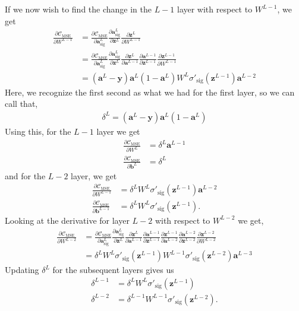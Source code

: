 \documentclass[a4paper,10pt]{article}
\newcommand{\pd}[2]{\frac{\partial {#1}}{\partial {#2}}}
\begin{document}
If we now wish to find the change in the $L-1$ layer with respect to $W^{L-1}$, we get
\begin{align*}
    \frac{\partial \mathcal{C}_\mathrm{MSE}}{\partial W^{L-1}} &= \pd{\mathcal{C}_\mathrm{MSE}}{\bm{a}^L_\mathrm{sig}}\pd{\bm{a}^L_\mathrm{sig}}{\bm{z}^L}\pd{\bm{z}^L}{W^{L-1}} \\
    &= \pd{\mathcal{C}_\mathrm{MSE}}{\bm{a}^L_\mathrm{sig}}\pd{\bm{a}^L_\mathrm{sig}}{\bm{z}^L}\pd{\bm{z}^L}{\bm{a}^{L-1}}\pd{\bm{a}^{L-1}}{\bm{z}^{L-1}}\pd{\bm{z}^{L-1}}{W^{L-1}} \\
    &= (\bm{a}^L - \bm{y}) \bm{a}^L(1-\bm{a}^L) W^L \sigma'_{\mathrm{sig}}(\bm{z}^{L-1})\bm{a}^{L-2}
\end{align*}
Here, we recognize the first second as what we had for the first layer, so we can call that,
\begin{align}
    \delta^L = (\bm{a}^L - \bm{y}) \bm{a}^L(1-\bm{a}^L)
    \label{eq:delta-change}
\end{align}
Using this, for the $L-1$ layer we get
\begin{align*}
    \frac{\partial \mathcal{C}_\mathrm{MSE}}{\partial W^L} &= \delta^L \bm{a}^{L-1} \\
    \frac{\partial \mathcal{C}_\mathrm{MSE}}{\partial \bm{b}^L} &= \delta^L 
\end{align*}
and for the $L-2$ layer, we get
\begin{align*}
    \frac{\partial \mathcal{C}_\mathrm{MSE}}{\partial W^{L-1}} &= \delta^L W^L \sigma'_{\mathrm{sig}}(\bm{z}^{L-1})\bm{a}^{L-2} \\
    \frac{\partial \mathcal{C}_\mathrm{MSE}}{\partial \bm{b}^{L-1}} &= \delta^L W^L \sigma'_{\mathrm{sig}}(\bm{z}^{L-1}).
\end{align*}
Looking at the derivative for layer $L-2$ with respect to $W^{L-2}$ we get,
\begin{align*}
    \frac{\partial \mathcal{C}_\mathrm{MSE}}{\partial W^{L-2}} &= \pd{\mathcal{C}_\mathrm{MSE}}{\bm{a}^L_\mathrm{sig}} \pd{\bm{a}^L_\mathrm{sig}}{\bm{z}^L} \pd{\bm{z}^L}{\bm{a}^{L-1}} \pd{\bm{a}^{L-1}}{\bm{z}^{L-1}} \pd{\bm{z}^{L-1}}{\bm{a}^{L-2}} \pd{\bm{a}^{L-2}}{\bm{z}^{L-2}} \pd{\bm{z}^{L-2}}{W^{L-2}} \\
    &= \delta^L W^L \sigma'_{\mathrm{sig}}(\bm{z}^{L-1}) W^{L-1} \sigma'_{\mathrm{sig}}(\bm{z}^{L-2}) \bm{a}^{L-3}
\end{align*}
Updating $\delta^L$ for the subsequent layers gives us
\begin{align*}
    \delta^{L-1} &= \delta^L W^L \sigma'_{\mathrm{sig}}(\bm{z}^{L-1}) \\
    \delta^{L-2} &= \delta^{L-1} W^{L-1} \sigma'_{\mathrm{sig}}(\bm{z}^{L-2}).
\end{align*}
\end{document}
